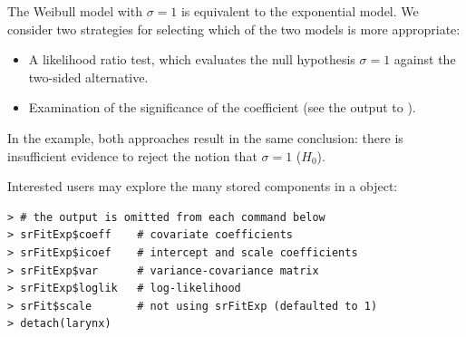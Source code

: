 \documentclass[11pt]{article}
\begin{document}
The Weibull model with $\sigma=1$ is equivalent to the exponential model. We consider two strategies for selecting which of the two models is more appropriate:
\begin{itemize}
\item A likelihood ratio test, which evaluates the null hypothesis $\sigma=1$ against the two-sided alternative.
\item Examination of the significance of the  coefficient (see the output to ).
\end{itemize}
In the example, both approaches result in the same conclusion: there is insufficient evidence to reject the notion that $\sigma=1$ ($H_0$).

Interested users may explore the many stored components in a  object:
\begin{verbatim}
> # the output is omitted from each command below
> srFitExp$coeff    # covariate coefficients
> srFitExp$icoef    # intercept and scale coefficients
> srFitExp$var      # variance-covariance matrix
> srFitExp$loglik   # log-likelihood
> srFit$scale       # not using srFitExp (defaulted to 1)
> detach(larynx)
\end{verbatim}

\pagebreak





{}
\label{references}

\vspace{4mm}


\end{document}
